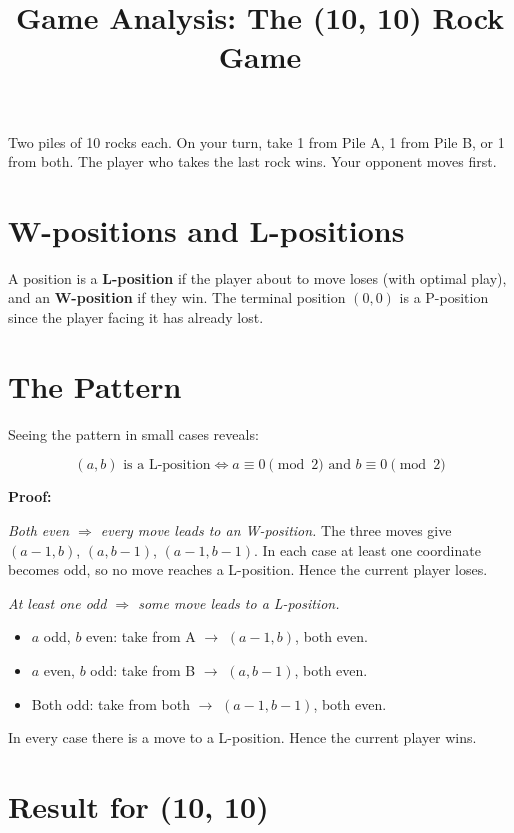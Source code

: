 \documentclass{article}
\title{Game Analysis: The (10, 10) Rock Game}
\author{}
\date{}
\begin{document}
\maketitle

\noindent Two piles of 10 rocks each. On your turn, take 1 from Pile A, 1 from Pile B, or 1 from both. The player who takes the last rock wins. Your opponent moves first.

\section*{W-positions and L-positions}

A position is a \textbf{L-position} if the player about to move loses (with optimal play), and an \textbf{W-position} if they win. The terminal position $(0,0)$ is a P-position since the player facing it has already lost.

\section*{The Pattern}

Seeing the pattern in small cases reveals:

\[
(a, b) \text{ is a L-position} \iff a \equiv 0 \pmod{2} \text{ and } b \equiv 0 \pmod{2}
\]

\textbf{Proof:}

\medskip
\noindent\textit{Both even $\Rightarrow$ every move leads to an W-position.}
The three moves give $(a-1,b)$, $(a,b-1)$, $(a-1,b-1)$. In each case at least one coordinate becomes odd, so no move reaches a L-position. Hence the current player loses. 

\medskip
\noindent\textit{At least one odd $\Rightarrow$ some move leads to a L-position.}
\begin{itemize}
  \item $a$ odd, $b$ even: take from A $\to$ $(a-1, b)$, both even.
  \item $a$ even, $b$ odd: take from B $\to$ $(a, b-1)$, both even.
  \item Both odd: take from both $\to$ $(a-1, b-1)$, both even.
\end{itemize}
In every case there is a move to a L-position. Hence the current player wins. 

\section*{Result for (10, 10)}
\end{document}
